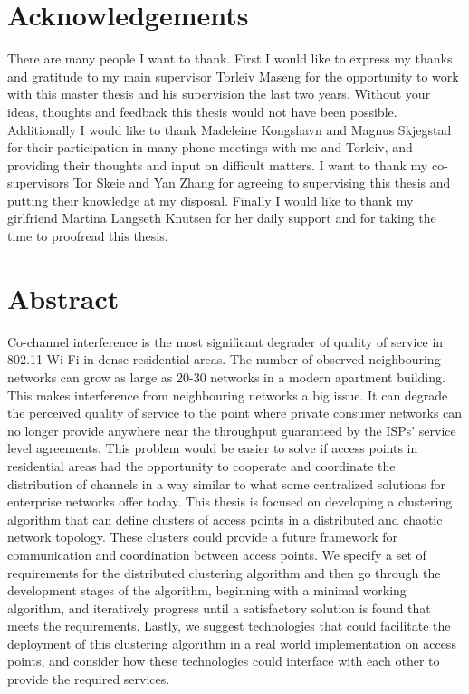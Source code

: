 \chapter*{Acknowledgements}
There are many people I want to thank.\newline
First I would like to express my thanks and gratitude to my main supervisor Torleiv Maseng for the opportunity to work with this master thesis and his supervision the last two years. Without
your ideas, thoughts and feedback this thesis would not have been possible. \newline
Additionally I would like to thank Madeleine Kongshavn and Magnus Skjegstad for their participation in many phone meetings with me and Torleiv, and providing their thoughts and
input on difficult matters. \newline
I want to thank my co-supervisors Tor Skeie and Yan Zhang for agreeing to supervising this thesis and putting their knowledge at my disposal. 
\newline
Finally I would like to thank my girlfriend Martina Langseth Knutsen for her daily support and for taking the time to proofread this thesis.

\clearpage

\newpage\null \thispagestyle {plain}



\chapter*{Abstract}
Co-channel interference is the most significant degrader of quality of service in 802.11 Wi-Fi in dense residential areas.
The number of observed neighbouring networks can grow as large as 20-30 networks in a modern apartment building. This makes
interference from neighbouring networks a big issue. It can degrade the perceived quality of service to the point where private consumer networks can no longer provide
anywhere near the throughput guaranteed by the ISPs' service level agreements. This problem would be easier to solve if access points in residential areas had the
opportunity to cooperate and coordinate the distribution of channels in a way similar to what some centralized solutions for enterprise networks offer today.
This thesis is focused on developing a clustering algorithm that can define clusters of access points in a distributed and chaotic network topology. These clusters could 
provide a future framework for communication and coordination between access points.
We specify a set of requirements for the distributed clustering algorithm and then go through the development stages of the algorithm,
beginning with a minimal working algorithm, and iteratively progress until a satisfactory solution is found that meets the requirements.
Lastly, we suggest technologies that could facilitate the deployment of this clustering algorithm in a real world implementation on access points, and consider
how these technologies could interface with each other to provide the required services.
\clearpage

\newpage\null \thispagestyle {plain}

